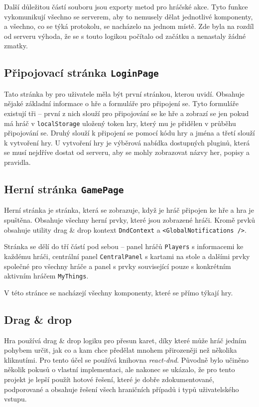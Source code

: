 Další důležitou částí souboru jsou exporty metod pro hráčské akce. Tyto funkce vykomunikují všechno se serverem, aby to nemusely dělat jednotlivé komponenty, a všechno, co se týká protokolu, se nacházelo na jednom místě. Zde byla na rozdíl od serveru výhoda, že se s touto logikou počítalo od začátku a nenastaly žádné zmatky.

\subsection{Připojovací stránka \texttt{LoginPage}}
Tato stránka by pro uživatele měla být první stránkou, kterou uvidí. Obsahuje nějaké základní informace o hře a formuláře pro připojení se. Tyto formuláře existují tři -- první z nich slouží pro připojování se ke hře a zobrazí se jen pokud má hráč v \texttt{localStorage} uložený token hry, který mu je přidělen v průběhu připojování se. Druhý slouží k připojení se pomocí kódu hry a jména a třetí slouží k vytvoření hry. U vytvoření hry je výběrová nabídka dostupných pluginů, která se musí nejdříve dostat od serveru, aby se mohly zobrazovat názvy her, popisy a pravidla.

\subsection{Herní stránka \texttt{GamePage}}
Herní stránka je stránka, která se zobrazuje, když je hráč připojen ke hře a hra je spuštěna. Obsahuje všechny herní prvky, které jsou zobrazené hráči. Kromě prvků obsahuje utility drag \& drop kontext \texttt{DndContext} a \texttt{<GlobalNotifications />}.

Stránka se dělí do tří částí pod sebou -- panel hráčů \texttt{Players} s informacemi ke každému hráči, centrální panel \texttt{CentralPanel} s kartami na stole a dalšími prvky společné pro všechny hráče a panel s prvky související pouze s konkrétním aktivním hráčem \texttt{MyThings}.

V této stránce se nacházejí všechny komponenty, které se přímo týkají hry.

\subsection{Drag \& drop}
Hra používá drag \& drop logiku pro přesun karet, díky které může hráč jedním pohybem určit, jak co a kam chce předělat mnohem přirozeněji než několika kliknutími. Pro tento účel se používá knihovna \emph{react-dnd}. Původně bylo učiněno několik pokusů o vlastní implementaci, ale nakonec se ukázalo, že pro tento projekt je lepší použít hotové řešení, které je dobře zdokumentované, podporované a obsahuje řešení všech hraničních případů i typů uživatelského vstupu.

